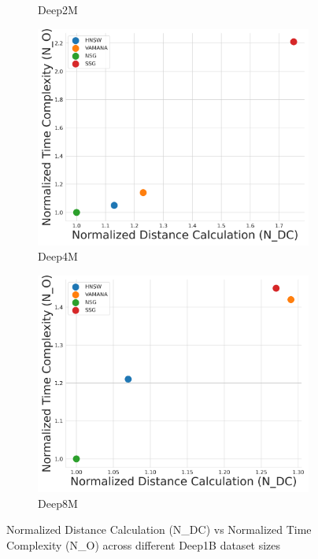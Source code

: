 \begin{figure}[htbp]
\begin{subfigure}{0.24\textwidth}
  \caption{Deep2M}
  \label{fig:2_ndc_no}
\end{subfigure}
\begin{subfigure}{0.24\textwidth}
  \centering
  \includegraphics[width=\linewidth]{../img/Experiments/BSC/4_ndc_no.png}
  \caption{Deep4M}
  \label{fig:4_ndc_no}
\end{subfigure}
\hfill
\begin{subfigure}{0.24\textwidth}
  \centering
  \includegraphics[width=\linewidth]{../img/Experiments/BSC/8_ndc_no.png}
  \caption{Deep8M}
  \label{fig:8_ndc_no}
\end{subfigure}
\caption{Normalized Distance Calculation (N\_DC) vs Normalized Time Complexity (N\_O) across different Deep1B dataset sizes}
\label{fig:ndc_no_plots}
\end{figure}


